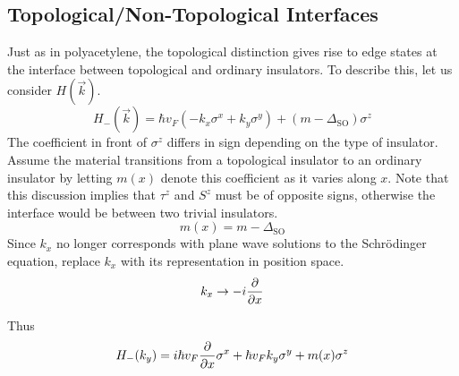 \documentclass[12pt,a4paper,titlepage]{article}
\newcommand{\trm}[1]{\textrm{#1}} %
\begin{document}
\subsection{Topological/Non-Topological Interfaces}
Just as in polyacetylene, the topological distinction gives rise to edge states at the interface between topological and ordinary insulators. To describe this, let us consider $H(\vec{k})$.
\begin{equation}
H_{-}(\vec{k})=\hbar v_{F}(-k_{x}\sigma^{x}+k_{y}\sigma^{y})+(m-\Delta_{\trm{SO}})\sigma^{z}
\end{equation}
The coefficient in front of $\sigma^{z}$ differs in sign depending on the type of insulator. Assume the material transitions from a topological insulator to an ordinary insulator by letting $m(x)$ denote this coefficient as it varies along $x$. Note that this discussion implies that $\tau^{z}$ and $S^{z}$ must be of opposite signs, otherwise the interface would be between two trivial insulators.
\begin{equation}
m(x)=m-\Delta_{\trm{SO}}
\end{equation}
Since $k_{x}$ no longer corresponds with plane wave solutions to the Schr\"{o}dinger equation, replace $k_{x}$ with its representation in position space.
\begin{equation}
k_{x}\rightarrow-i\pdv{x}
\end{equation}

Thus
\begin{equation}
H_{-}(k_{y})=i\hbar v_{F}\pdv{x}\sigma^{x}+\hbar v_{F}k_{y}\sigma^{y}+m(x)\sigma^{z}
\end{equation}
\end{document}

